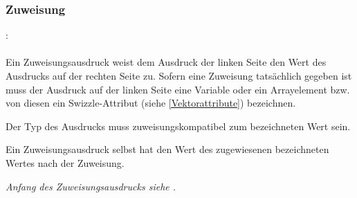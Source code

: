 \subsubsection{Zuweisung}\label{Zuweisung}
:\label{asdr_zuweisung_suffix}\\
\hspace*{1cm}\Gt{=}\Gspace{} \\

Ein Zuweisungsausdruck   weist dem Ausdruck der linken Seite den Wert des Ausdrucks
auf der rechten Seite zu. Sofern eine Zuweisung tatsächlich gegeben ist muss
der Ausdruck auf der linken Seite eine Variable oder ein Arrayelement
bzw. von diesen ein Swizzle-Attribut (siehe \ref{Vektorattribute}) bezeichnen.

Der Typ des Ausdrucks muss zuweisungskompatibel zum bezeichneten Wert
sein.

Ein Zuweisungsausdruck selbst hat den Wert des zugewiesenen bezeichneten Wertes nach der Zuweisung.

\emph{Anfang des Zuweisungsausdrucks siehe .}

